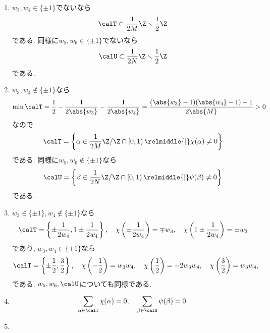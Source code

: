 \documentclass[11pt,b5paper,oneside,lualatex]{ltjsarticle} %
\numberwithin{equation}{section} %
\begin{document}
\begin{rem} \label{rem:G(q)_calS_property}
	\begin{enumerate}
		\item \label{item:rem:G(q)_calS_subset}
		$ w_3, w_4 \in \{ \pm 1 \} $でないなら
		\[
		\calT \subset \frac{1}{2M} \Z \smallsetminus \frac{1}{2} \Z
		\]
		である. 
		同様に$ w_5, w_6 \in \{ \pm 1 \} $でないなら
		\[
		\calU \subset \frac{1}{2N} \Z \smallsetminus \frac{1}{2} \Z
		\]
		である. 
		\item \label{item:rem:G(q)_calS_rep}
		$ w_3, w_4 \notin \{ \pm 1 \} $なら
		\[
		\min \calT
		=
		\frac{1}{2} - \frac{1}{2 \abs{w_3}} - \frac{1}{2 \abs{w_4}}
		=
		\frac{(\abs{w_3} - 1) (\abs{w_4} - 1) - 1}{2 \abs{M}}
		> 0
		\]
		なので
		\[
		\calT = \left\{ \alpha \in \frac{1}{2M}\Z/\Z \cap \left[ 0, 1 \right) \relmiddle{|} \chi(\alpha) \neq 0 \right\}
		\]
		である. 
		同様に$ w_5, w_6 \notin \{ \pm 1 \} $なら
		\[
		\calU = \left\{ \beta \in \frac{1}{2N}\Z/\Z \cap \left[ 0, 1 \right) \relmiddle{|} \psi(\beta) \neq 0 \right\}
		\]
		である. 
		\item \label{item:rem:G(q)_calS_rep_Seifert}
		$ w_3 \in \{ \pm 1 \}, w_4 \notin \{ \pm 1 \} $なら
		\[
		\calT = \left\{ \pm \frac{1}{2 w_4}, 1 \pm \frac{1}{2 w_4} \right\}, \quad
		\chi \left( \pm \frac{1}{2 w_4} \right) = \mp w_3, \quad
		\chi \left( 1 \pm \frac{1}{2 w_4} \right) = \pm w_3
		\]
		であり, 
		$ w_3, w_4 \in \{ \pm 1 \} $なら
		\[
		\calT = \left\{ \pm \frac{1}{2}, \frac{3}{2} \right\}, \quad
		\chi \left( -\frac{1}{2} \right) = w_3 w_4, \quad
		\chi \left( \frac{1}{2} \right) = -2 w_3 w_4, \quad
		\chi \left( \frac{3}{2} \right) = w_3 w_4, \quad
		\]
		である. 
		$ w_5, w_6, \calU $についても同様である. 
		\item \label{item:rem:G(q)_calS_zero}
		\[
		\sum_{\alpha \in \calT} \chi(\alpha) = 0, \quad
		\sum_{\beta \in \calU} \psi(\beta) = 0.
		\]
		\item \label{item:rem:G(q)_calS_zero_alpha}
		\begin{align}

\end{align}
\end{enumerate}
\end{rem}
\end{document}

